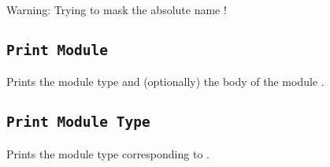\begin{ErrMsgs}
  \item {}
\end{ErrMsgs}

\begin{Warnings}
  \item Warning: Trying to mask the absolute name {\qualid} !
\end{Warnings}

\subsection{\tt Print Module {\ident}
}

Prints the module type and (optionally) the body of the module {\ident}.

\subsection{\tt Print Module Type {\ident}
}

Prints the module type corresponding to {\ident}.


